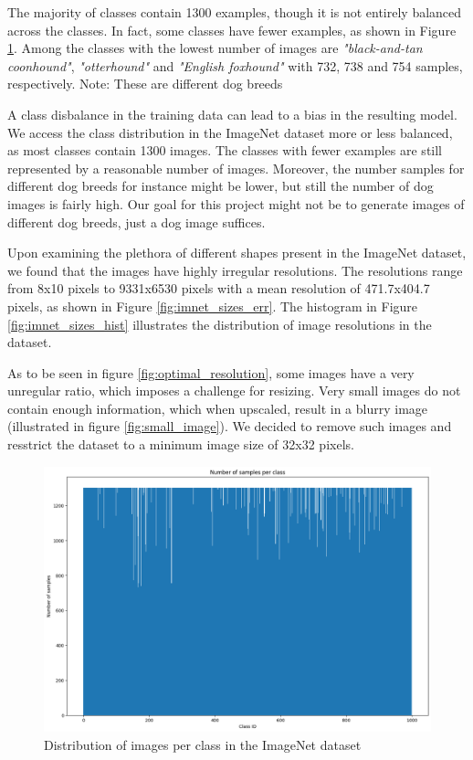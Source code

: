 \documentclass[10pt,a4paper,twoside]{article}
\begin{document}
    The majority of classes contain 1300 examples, though it is not entirely balanced across the classes. In fact, some classes have fewer examples, as shown in Figure \ref{fig:imnet_dist}. Among the classes with the lowest number of images are \textit{"black-and-tan coonhound"}, \textit{"otterhound"} and \textit{"English foxhound"} with 732, 738 and 754 samples, respectively. Note: These are different dog breeds

    A class disbalance in the training data can lead to a bias in the resulting model. We access the class distribution in the ImageNet dataset more or less balanced, as most classes contain 1300 images. The classes with fewer examples are still represented by a reasonable number of images. Moreover, the number samples for different dog breeds for instance might be lower, but still the number of dog images is fairly high. Our goal for this project might not be to generate images of different dog breeds, just a dog image suffices.

    Upon examining the plethora of different shapes present in the ImageNet dataset, we found that the images have highly irregular resolutions. The resolutions range from 8x10 pixels to 9331x6530 pixels with a mean resolution of 471.7x404.7 pixels, as shown in Figure \ref{fig:imnet_sizes_err}. The histogram in Figure \ref{fig:imnet_sizes_hist} illustrates the distribution of image resolutions in the dataset.

    As to be seen in figure \ref{fig:optimal_resolution}, some images have a very unregular ratio, which imposes a challenge for resizing. Very small images do not contain enough information, which when upscaled, result in a blurry image (illustrated in figure \ref{fig:small_image}). We decided to remove such images and resstrict the dataset to a minimum image size of 32x32 pixels.

    \begin{figure}
        \centering
        \includegraphics[width=\textwidth]{../../sample_images/imagenet_dist.png}
        \caption{Distribution of images per class in the ImageNet dataset}
        \label{fig:imnet_dist}
    \end{figure}
\end{document}
